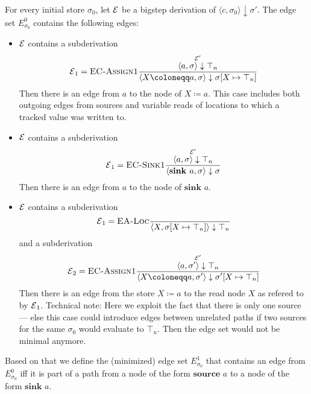 For every initial store $\sigma_0$, 
let $\operatorname{\mathcal{E}}$ be a bigstep derivation of $\langle c, \sigma_0 \rangle \downarrow \sigma'$.
The edge set $E^0_{\sigma_0}$ contains the following edges:
\begin{itemize}
    \item $\operatorname{\mathcal{E}}$ contains a subderivation
    \begin{equation*}
        \E_1 = \textsc{EC-Assign1}\ddfrac{\overset{\E'}{\langle a, \sigma \rangle \downarrow \top_n}}
        {\langle X \coloneqq a, \sigma \rangle \downarrow
         \sigma[X \mapsto \top_n]}
    \end{equation*}
    Then there is an edge from $a$ to the node of $X \coloneqq a$.
    This case includes both outgoing edges from sources and variable reads
    of locations to which a tracked value was written to.
    \item $\operatorname{\mathcal{E}}$ contains a subderivation
    \begin{equation*}
        \operatorname{\mathcal{E}}_1 = \textsc{EC-Sink1}\frac{\displaystyle \overset{\operatorname{\mathcal{E}}'}{\langle a, \sigma \rangle \downarrow \top_n}}{\displaystyle \langle \textbf{sink }a, \sigma \rangle \downarrow
         \sigma}
    \end{equation*}
    Then there is an edge from $a$ to the node of $\textbf{sink }a$.
    \item
    $\operatorname{\mathcal{E}}$ contains a subderivation
    \begin{equation*}
        \operatorname{\mathcal{E}}_1 = \textsc{EA-Loc}\frac{\displaystyle }{\displaystyle \langle X, \sigma[X \mapsto \top_n] \rangle \downarrow \top_n}
    \end{equation*}
    and a subderivation
    \begin{equation*}
        \E_2 = \textsc{EC-Assign1}\ddfrac{\overset{\E'}{\langle a, \sigma' \rangle \downarrow \top_n}}
        {\langle X \coloneqq a, \sigma' \rangle \downarrow
         \sigma'[X \mapsto \top_n]}
    \end{equation*}
    Then there is an edge from the store $X \coloneqq a$ to the read node $X$ as 
    refered to by $\operatorname{\mathcal{E}}_1$.
    Technical note: Here we exploit the fact that there is only one source ---
    else this case could introduce edges between unrelated paths if two sources for the same 
    $\sigma_0$ would evaluate to $\top_n$. Then the edge set would not be minimal
    anymore.

\end{itemize}
Based on that we define the (minimized) edge set $E^1_{\sigma_0}$
that contains an edge from $E^0_{\sigma_0}$ iff it is part of a path 
from a node of the form $\textbf{source }a$
to a node of the form $\textbf{sink }a$.

